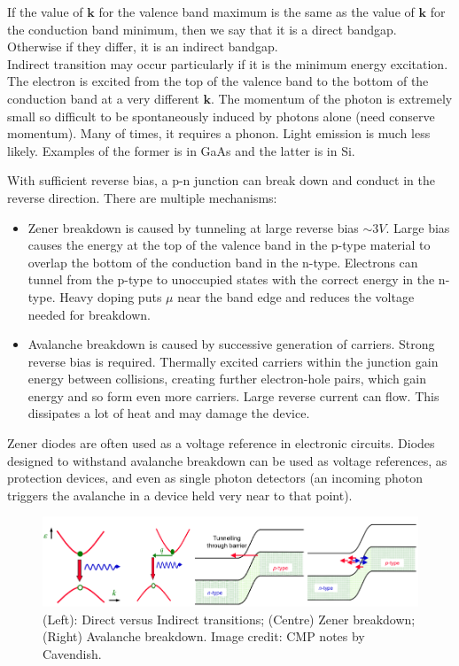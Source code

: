 \documentclass[a4paper]{article}
\begin{document}
\newpage
\begin{Note}
If the value of $\mathbf{k}$ for the valence band maximum is the same as the value of $\mathbf{k}$ for the conduction band minimum, then we say that it is a direct bandgap. Otherwise if they differ, it is an indirect bandgap.\\[5pt]
Indirect transition may occur particularly if it is the minimum energy excitation. The electron is excited from the top of the valence band to the bottom of the conduction band at a very different $\mathbf{k}$. The momentum of the photon is extremely small so difficult to be spontaneously induced by photons alone (need conserve momentum). Many of times, it requires a phonon. Light emission is much less likely. Examples of the former is in GaAs and the latter is in Si.
\end{Note}
\begin{Note}
With sufficient reverse bias, a p-n junction can break down and conduct in the reverse direction. There are multiple mechanisms:
\begin{itemize}
    \item Zener breakdown is caused by tunneling at large reverse bias $\sim3V$. Large bias causes the energy at the top of the valence band in the p-type material to overlap the bottom of the conduction band in the n-type. Electrons can tunnel from the p-type to unoccupied states with the correct energy in the n-type. Heavy doping puts $\mu$ near the band edge and reduces the voltage needed for breakdown.
    \item Avalanche breakdown is caused by successive generation of carriers. Strong reverse bias is required. Thermally excited carriers within the junction gain energy between collisions, creating further electron-hole pairs, which gain energy and so form even more carriers. Large reverse current can flow. This dissipates a lot of heat and may damage the device.
\end{itemize}
Zener diodes are often used as a voltage reference in electronic circuits. Diodes designed to withstand avalanche breakdown can be used as voltage references, as protection devices, and even as single photon detectors (an incoming photon triggers the avalanche in a device held very near to that point).
\end{Note}
\begin{figure}[H]
    \centering
    \includegraphics[width=\linewidth]{semicon2.PNG}
    \caption{(Left): Direct versus Indirect transitions; (Centre) Zener breakdown; (Right) Avalanche breakdown. Image credit: CMP notes by Cavendish.}
\end{figure}
\end{document}
